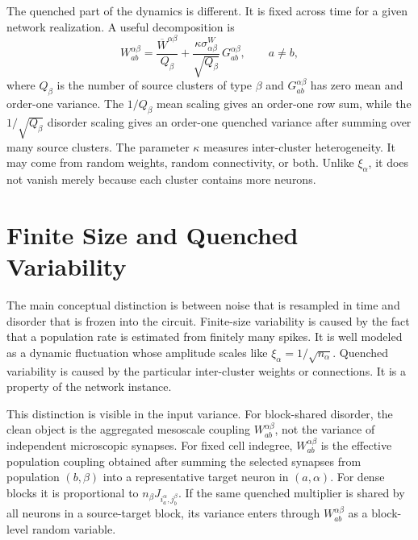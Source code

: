 The quenched part of the dynamics is different. It is fixed across time for a
given network realization. A useful decomposition is
\begin{equation}
    W_{ab}^{\alpha\beta}
    =
    \frac{\overline W^{\alpha\beta}}{Q_\beta}
    +
    \frac{\kappa\sigma_{\alpha\beta}^{W}}{\sqrt{Q_\beta}}\,
    G_{ab}^{\alpha\beta},
    \qquad a\ne b,
    \label{eq:ch08-quenched-decomposition}
\end{equation}
where \(Q_\beta\) is the number of source clusters of type \(\beta\) and
\(G_{ab}^{\alpha\beta}\) has zero mean and order-one variance. The
\(1/Q_\beta\) mean scaling gives an order-one row sum, while the
\(1/\sqrt{Q_\beta}\) disorder scaling gives an order-one quenched variance after
summing over many source clusters. The parameter \(\kappa\) measures
inter-cluster heterogeneity. It may come from random weights, random
connectivity, or both. Unlike \(\xi_\alpha\), it does not vanish merely because
each cluster contains more neurons.

\section{Finite Size and Quenched Variability}
\label{sec:ch08-finite-vs-quenched}

The main conceptual distinction is between noise that is resampled in time and
disorder that is frozen into the circuit. Finite-size variability is caused by
the fact that a population rate is estimated from finitely many spikes. It is
well modeled as a dynamic fluctuation whose amplitude scales like
\(\xi_\alpha=1/\sqrt{n_\alpha}\). Quenched variability is caused by the particular
inter-cluster weights or connections. It is a property of the network instance.

This distinction is visible in the input variance. For block-shared disorder,
the clean object is the aggregated mesoscale coupling
\(W_{ab}^{\alpha\beta}\), not the variance of independent microscopic
synapses. For fixed cell indegree, \(W_{ab}^{\alpha\beta}\) is the effective
population coupling obtained after summing the selected synapses from
population \((b,\beta)\) into a representative target neuron in
\((a,\alpha)\). For dense blocks it is proportional to
\(n_\beta J_{i_a^\alpha,j_b^\beta}\). If the same quenched multiplier is shared
by all neurons in a source-target block, its variance enters through
\(W_{ab}^{\alpha\beta}\) as a block-level random variable.

